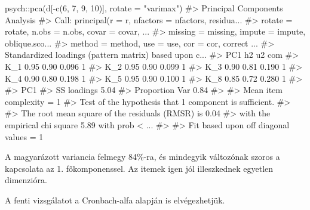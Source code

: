 \documentclass[
  letterpaper,
]{krantz}
\makeatletter
\newenvironment{Shaded}{\begin{snugshade}}{\end{snugshade}}
\newcommand{\AttributeTok}[1]{\textcolor[rgb]{0.40,0.45,0.13}{#1}}
\newcommand{\CommentTok}[1]{\textcolor[rgb]{0.37,0.37,0.37}{#1}}
\newcommand{\DecValTok}[1]{\textcolor[rgb]{0.68,0.00,0.00}{#1}}
\newcommand{\FunctionTok}[1]{\textcolor[rgb]{0.28,0.35,0.67}{#1}}
\newcommand{\NormalTok}[1]{\textcolor[rgb]{0.00,0.23,0.31}{#1}}
\newcommand{\SpecialCharTok}[1]{\textcolor[rgb]{0.37,0.37,0.37}{#1}}
\newcommand{\StringTok}[1]{\textcolor[rgb]{0.13,0.47,0.30}{#1}}
\newenvironment{kframe}{%
\medskip{}
\setlength{\fboxsep}{.8em}
 \def\at@end@of@kframe{}%
 \ifinner\ifhmode%
  \def\at@end@of@kframe{\end{minipage}}%
  \begin{minipage}{\columnwidth}%
 \fi\fi%
 \def\FrameCommand##1{\hskip\@totalleftmargin \hskip-\fboxsep
 \colorbox{shadecolor}{##1}\hskip-\fboxsep
     \hskip-\linewidth \hskip-\@totalleftmargin \hskip\columnwidth}%
 \MakeFramed {\advance\hsize-\width
   \@totalleftmargin\z@ \linewidth\hsize
   \@setminipage}}%
 {\par\unskip\endMakeFramed%
 \at@end@of@kframe}
\renewenvironment{Shaded}{\begin{kframe}}{\end{kframe}}
\makeatother
\begin{document}
\begin{Shaded}
\begin{Highlighting}[]
\NormalTok{psych}\SpecialCharTok{::}\FunctionTok{pca}\NormalTok{(d[}\SpecialCharTok{{-}}\FunctionTok{c}\NormalTok{(}\DecValTok{6}\NormalTok{, }\DecValTok{7}\NormalTok{, }\DecValTok{9}\NormalTok{, }\DecValTok{10}\NormalTok{)], }\AttributeTok{rotate =} \StringTok{"varimax"}\NormalTok{)}
\CommentTok{\#\textgreater{} Principal Components Analysis}
\CommentTok{\#\textgreater{} Call: principal(r = r, nfactors = nfactors, residua...}
\CommentTok{\#\textgreater{}     rotate = rotate, n.obs = n.obs, covar = covar, ...}
\CommentTok{\#\textgreater{}     missing = missing, impute = impute, oblique.sco...}
\CommentTok{\#\textgreater{}     method = method, use = use, cor = cor, correct ...}
\CommentTok{\#\textgreater{} Standardized loadings (pattern matrix) based upon c...}
\CommentTok{\#\textgreater{}      PC1   h2    u2 com}
\CommentTok{\#\textgreater{} K\_1 0.95 0.90 0.096   1}
\CommentTok{\#\textgreater{} K\_2 0.95 0.90 0.099   1}
\CommentTok{\#\textgreater{} K\_3 0.90 0.81 0.190   1}
\CommentTok{\#\textgreater{} K\_4 0.90 0.80 0.198   1}
\CommentTok{\#\textgreater{} K\_5 0.95 0.90 0.100   1}
\CommentTok{\#\textgreater{} K\_8 0.85 0.72 0.280   1}
\CommentTok{\#\textgreater{} }
\CommentTok{\#\textgreater{}                 PC1}
\CommentTok{\#\textgreater{} SS loadings    5.04}
\CommentTok{\#\textgreater{} Proportion Var 0.84}
\CommentTok{\#\textgreater{} }
\CommentTok{\#\textgreater{} Mean item complexity =  1}
\CommentTok{\#\textgreater{} Test of the hypothesis that 1 component is sufficient.}
\CommentTok{\#\textgreater{} }
\CommentTok{\#\textgreater{} The root mean square of the residuals (RMSR) is  0.04 }
\CommentTok{\#\textgreater{}  with the empirical chi square  5.89  with prob \textless{}  ...}
\CommentTok{\#\textgreater{} }
\CommentTok{\#\textgreater{} Fit based upon off diagonal values = 1}
\end{Highlighting}
\end{Shaded}

A magyarázott variancia felmegy 84\%-ra, és mindegyik változónak szoros
a kapcsolata az 1. főkomponenssel. Az itemek igen jól illeszkednek
egyetlen dimenzióra.

A fenti vizsgálatot a Cronbach-alfa alapján is elvégezhetjük.
\end{document}
